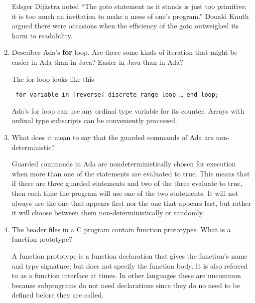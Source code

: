 \begin{enumerate}
  \begin{answer}

    Edsger Dijkstra noted “The goto statement as it stands is just too primitive; it is too much an invitation to make a mess of one’s program.” Donald Knuth argued there were occasions when the efficiency of the goto outweighed its harm to readability.

  \end{answer}

  \item Describes Ada's \textbf{for} loop. Are there some
    kinds of iteration that might be easier in Ada than
    in Java? Easier in Java than in Ada?

  \begin{answer}

  	The for loop looks like this
    \begin{lstlisting} for variable in [reverse] discrete_range loop … end loop; \end{lstlisting}
    Ada’s for loop can use any ordinal type variable for its counter. Arrays with ordinal type subscripts can be conveniently processed.

  \end{answer}

  \item What does it mean to say that the guarded commands
    of Ada are non-deterministic?

  \begin{answer}

  	Guarded commands in Ada are nondeterministically chosen for execution when more than one of the statements are evaluated to true. This means that if there are three guarded statements and two of the three evaluate to true, then each time the program will use one of the two statements. It will not always use the one that appears first nor the one that appears last, but rather it will choose between them non-deterministically or randomly.

  \end{answer}

  \item The header files in a C program contain function
    prototypes. What is a function prototype?

  \begin{answer}

  	A function prototype is a function declaration that gives the function's name and type signature, but does not specify the function body. It is also referred to as a function interface at times. In other languages these are uncommon because subprograms do not need declarations since they do no need to be defined before they are called.


\end{answer}
\end{enumerate}
